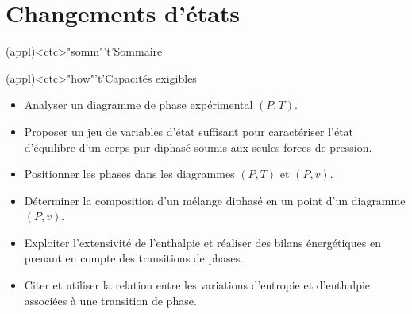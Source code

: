 \documentclass[../../main/main.tex]{subfiles}
\begin{document}
\setcounter{chapter}{5}


\chapter{Changements d'états}

\vspace*{\fill}

\begin{tcn}(appl)<ctc>"somm"'t'{Sommaire}
	\let\item\olditem
	\vspace{-15pt}
	\minitoc
	\vspace{-25pt}
\end{tcn}

\begin{tcn}[fontupper=\footnotesize](appl)<ctc>"how"'t'{Capacités exigibles}
	\begin{itemize}[label=\rcheck]
		\item Analyser un diagramme de phase expérimental $(P,T)$.

		\item Proposer un jeu de variables d'état suffisant pour caractériser l'état
		      d'équilibre d'un corps pur diphasé soumis aux seules forces de
		      pression.

		\item Positionner les phases dans les diagrammes $(P,T)$ et $(P,v)$.

		\item Déterminer la composition d'un mélange diphasé en un point d'un
		      diagramme $(P,v)$.

		\item Exploiter l'extensivité de l'enthalpie et réaliser des bilans
		      énergétiques en prenant en compte des transitions de phases.

		\item Citer et utiliser la relation entre les variations d'entropie et
		      d'enthalpie associées à une transition de phase.
	\end{itemize}
\end{tcn}
\end{document}
